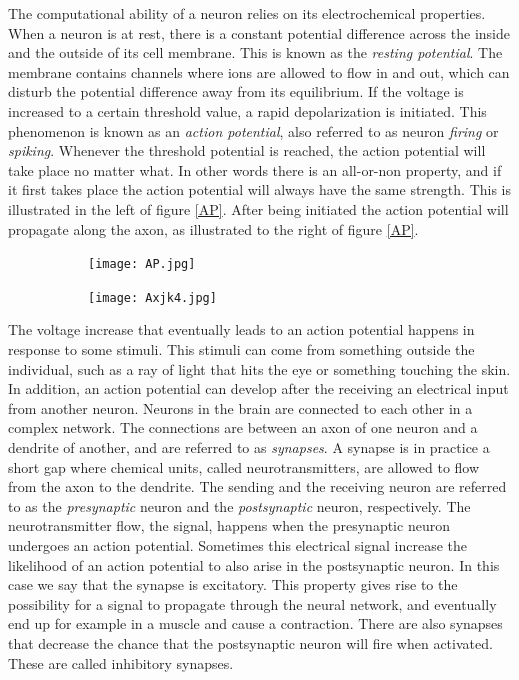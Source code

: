 The computational ability of a neuron relies on its electrochemical properties. When a neuron is at rest, there is a constant potential difference across the inside and the outside of its cell membrane. This is known as the \textit{resting potential}. The membrane contains channels where ions are allowed to flow in and out, which can disturb the potential difference away from its equilibrium. If the voltage is increased to a certain threshold value, a rapid depolarization is initiated. This phenomenon is known as an \textit{action potential}, also referred to as neuron \textit{firing} or \textit{spiking}. Whenever the threshold potential is reached, the action potential will take place no matter what. In other words there is an all-or-non property, and if it first takes place the action potential will always have the same strength. This is illustrated in the left of figure \ref{AP}. After being initiated the action potential will propagate along the axon, as illustrated to the right of figure \ref{AP}.

\begin{figure}[h]
\caption{Graphical representation of an action potential (left). Illustration of action potential propagating along axon (right).}
\label{AP}
\begin{subfigure}
\centering
\texttt{[image: AP.jpg]}
\end{subfigure}
\begin{subfigure}
\centering
\texttt{[image: Axjk4.jpg]}
\end{subfigure}
\end{figure} 

The voltage increase that eventually leads to an action potential happens in response to some stimuli. This stimuli can come from something outside the individual, such as a ray of light that hits the eye or something touching the skin. In addition, an action potential can develop after the receiving an electrical input from another neuron. Neurons in the brain are connected to each other in a complex network. The connections are between an axon of one neuron and a dendrite of another, and are referred to as \textit{synapses}. A synapse is in practice a short gap where chemical units, called neurotransmitters, are allowed to flow from the axon to the dendrite. The sending and the receiving neuron are referred to as the \textit{presynaptic} neuron and the \textit{postsynaptic} neuron, respectively. The neurotransmitter flow, the signal, happens when the presynaptic neuron undergoes an action potential. Sometimes this electrical signal increase the likelihood of an action potential to also arise in the postsynaptic neuron. In this case we say that the synapse is excitatory. This property gives rise to the possibility for a signal to propagate through the neural network, and eventually end up for example in a muscle and cause a contraction. There are also synapses that decrease the chance that the postsynaptic neuron will fire when activated. These are called inhibitory synapses.

